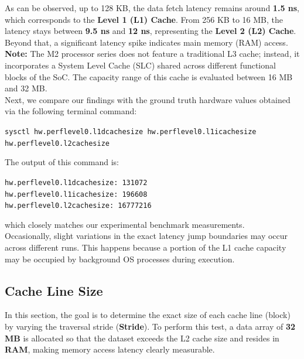 \documentclass{article}
\begin{document}
	\begin{tcolorbox}[colback=green!5!white, colframe=green!75!black, title=Results]
		As can be observed, up to 128 KB, the data fetch latency remains around \textbf{1.5 ns}, which corresponds to the \textbf{Level 1 (L1) Cache}. From 256 KB to 16 MB, the latency stays between \textbf{9.5 ns} and \textbf{12 ns}, representing the \textbf{Level 2 (L2) Cache}. Beyond that, a significant latency spike indicates main memory (RAM) access.\\
		\textbf{Note:} The M2 processor series does not feature a traditional L3 cache; instead, it incorporates a System Level Cache (SLC) shared across different functional blocks of the SoC. The capacity range of this cache is evaluated between 16 MB and 32 MB.\\
		
		Next, we compare our findings with the ground truth hardware values obtained via the following terminal command:
		\begin{center}
			\texttt{sysctl hw.perflevel0.l1dcachesize hw.perflevel0.l1icachesize hw.perflevel0.l2cachesize}
		\end{center}
		
		The output of this command is:
		\begin{center}
			\texttt{hw.perflevel0.l1dcachesize: 131072\\
				hw.perflevel0.l1icachesize: 196608\\
				hw.perflevel0.l2cachesize: 16777216}
		\end{center}
		which closely matches our experimental benchmark measurements.\\ 
		
		Occasionally, slight variations in the exact latency jump boundaries may occur across different runs. This happens because a portion of the L1 cache capacity may be occupied by background OS processes during execution.
	\end{tcolorbox}
	
	\subsection{Cache Line Size}
	
	In this section, the goal is to determine the exact size of each cache line (block) by varying the traversal stride (\textbf{Stride}). To perform this test, a data array of \textbf{32 MB} is allocated so that the dataset exceeds the L2 cache size and resides in \textbf{RAM}, making memory access latency clearly measurable.
	
\end{document}
